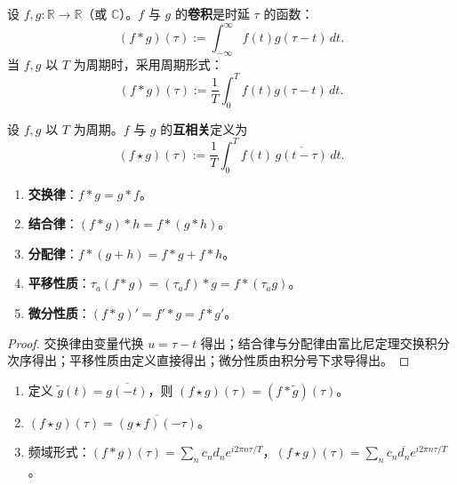 \begin{definition}[卷积（时延乘积）]\label{def:convolution}
设 $f, g: \mathbb{R} \to \mathbb{R}$（或 $\mathbb{C}$）。$f$ 与 $g$ 的\textbf{卷积}是时延 $\tau$ 的函数：
\[
(f * g)(\tau) := \int_{-\infty}^{\infty} f(t) g(\tau - t)\,dt.
\]
当 $f, g$ 以 $T$ 为周期时，采用周期形式：
\[
(f * g)(\tau) := \frac{1}{T}\int_0^T f(t) g(\tau - t)\,dt.
\]
\end{definition}

\begin{definition}\label{def:cross_correlation}
设 $f, g$ 以 $T$ 为周期。$f$ 与 $g$ 的\textbf{互相关}定义为
\[
(f \star g)(\tau) := \frac{1}{T}\int_0^T f(t)\, \overline{g(t - \tau)}\,dt.
\]
\end{definition}

\begin{proposition}[卷积的基本代数性质]\label{prop:convolution_properties}
\begin{enumerate}[label=(\roman*)]
    \item \textbf{交换律}：$f * g = g * f$。
    \item \textbf{结合律}：$(f * g) * h = f * (g * h)$。
    \item \textbf{分配律}：$f * (g + h) = f * g + f * h$。
    \item \textbf{平移性质}：$\tau_a(f * g) = (\tau_a f) * g = f * (\tau_a g)$。
    \item \textbf{微分性质}：$(f * g)' = f' * g = f * g'$。
\end{enumerate}
\end{proposition}

\begin{proof}
交换律由变量代换 $u = \tau - t$ 得出；结合律与分配律由富比尼定理交换积分次序得出；平移性质由定义直接得出；微分性质由积分号下求导得出。
\end{proof}

\begin{proposition}[互相关与卷积的关系及频域形式]\label{prop:cross_corr_properties}
\begin{enumerate}[label=(\roman*)]
    \item 定义 $\widetilde{g}(t) = \overline{g(-t)}$，则 $(f \star g)(\tau) = (f * \widetilde{g})(\tau)$。
    \item $(f \star g)(\tau) = \overline{(g \star f)(-\tau)}$。
    \item 频域形式：$(f * g)(\tau) = \sum_{n} c_n d_n e^{i 2\pi n \tau / T}$，$(f \star g)(\tau) = \sum_{n} c_n \overline{d_n} e^{i 2\pi n \tau / T}$。
\end{enumerate}
\end{proposition}


